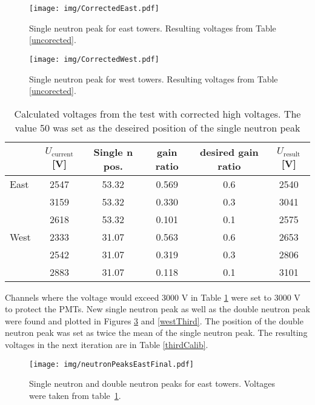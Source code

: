 \begin{figure}[!htb]
\begin{center}
\texttt{[image: img/CorrectedEast.pdf]}
\end{center}
\caption{Single neutron peak for east towers. Resulting voltages from Table \ref{uncorected}.}
\label{eastPlot}
\end{figure}

\begin{figure}[!htb]
\begin{center}
\texttt{[image: img/CorrectedWest.pdf]}
\end{center}
\caption{Single neutron peak for west towers. Resulting voltages from Table \ref{uncorected}.}
\label{westPlot}
\end{figure}

\begin{table}[!htb] 
\caption{Calculated voltages from the test with corrected high voltages.
The value 50 was set as the deseired position of the single neutron peak}
\label{corected}
\begin{center}
\begin{tabular}{lccccc}
\toprule
&$U_\text{current}$[V]&Single n pos.&gain ratio&desired gain ratio&$U_\text{result}$[V]\\
\midrule
 East&2547&53.32&0.569&0.6&2540\\
     &3159&53.32&0.330&0.3&3041\\
     &2618&53.32&0.101&0.1&2575\\
\midrule
West&2333&31.07&0.563&0.6&2653\\
    &2542&31.07&0.319&0.3&2806\\
    &2883&31.07&0.118&0.1&3101\\
\bottomrule
\end{tabular}
\end{center}
\end{table}

Channels where the voltage would exceed 3000 V in Table \ref{corected} were set to 3000 V to
protect the PMTs. New single neutron peak as well as the double neutron peak were found and
plotted in Figures \ref{eastThird}
and \ref{westThird}. The position of the double neutron peak was set as twice the mean
of the single neutron peak.
The resulting voltages in the next iteration are in Table \ref{thirdCalib}.

\begin{figure}[htb]
\begin{center}
\texttt{[image: img/neutronPeaksEastFinal.pdf]}
\end{center}
\caption{Single neutron and double neutron peaks for east towers.
Voltages were taken from table~\ref{corected}.}
\label{eastThird}
\end{figure}

